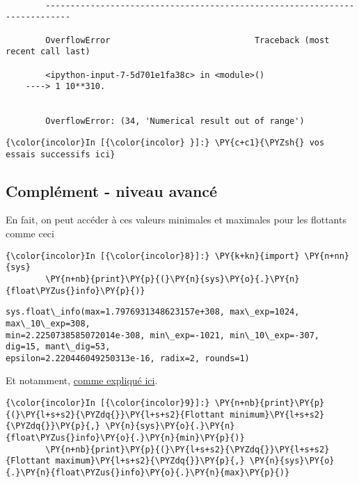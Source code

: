     \begin{Verbatim}[commandchars=\\\{\}]

        ---------------------------------------------------------------------------

        OverflowError                             Traceback (most recent call last)

        <ipython-input-7-5d701e1fa38c> in <module>()
    ----> 1 10**310.
    

        OverflowError: (34, 'Numerical result out of range')

    \end{Verbatim}

    \begin{Verbatim}[commandchars=\\\{\}]
{\color{incolor}In [{\color{incolor} }]:} \PY{c+c1}{\PYZsh{} vos essais successifs ici}
\end{Verbatim}


    \hypertarget{compluxe9ment---niveau-avancuxe9}{%
\subsection{Complément - niveau
avancé}\label{compluxe9ment---niveau-avancuxe9}}

    En fait, on peut accéder à ces valeurs minimales et maximales pour les
flottants comme ceci

    \begin{Verbatim}[commandchars=\\\{\}]
{\color{incolor}In [{\color{incolor}8}]:} \PY{k+kn}{import} \PY{n+nn}{sys}
        \PY{n+nb}{print}\PY{p}{(}\PY{n}{sys}\PY{o}{.}\PY{n}{float\PYZus{}info}\PY{p}{)}
\end{Verbatim}


    \begin{Verbatim}[commandchars=\\\{\}]
sys.float\_info(max=1.7976931348623157e+308, max\_exp=1024, max\_10\_exp=308,
min=2.2250738585072014e-308, min\_exp=-1021, min\_10\_exp=-307, dig=15, mant\_dig=53,
epsilon=2.220446049250313e-16, radix=2, rounds=1)

    \end{Verbatim}

    Et notamment,
\href{https://docs.python.org/3/library/sys.html\#sys.float_info}{comme
expliqué ici}.

    \begin{Verbatim}[commandchars=\\\{\}]
{\color{incolor}In [{\color{incolor}9}]:} \PY{n+nb}{print}\PY{p}{(}\PY{l+s+s2}{\PYZdq{}}\PY{l+s+s2}{Flottant minimum}\PY{l+s+s2}{\PYZdq{}}\PY{p}{,} \PY{n}{sys}\PY{o}{.}\PY{n}{float\PYZus{}info}\PY{o}{.}\PY{n}{min}\PY{p}{)}
        \PY{n+nb}{print}\PY{p}{(}\PY{l+s+s2}{\PYZdq{}}\PY{l+s+s2}{Flottant maximum}\PY{l+s+s2}{\PYZdq{}}\PY{p}{,} \PY{n}{sys}\PY{o}{.}\PY{n}{float\PYZus{}info}\PY{o}{.}\PY{n}{max}\PY{p}{)}
\end{Verbatim}


